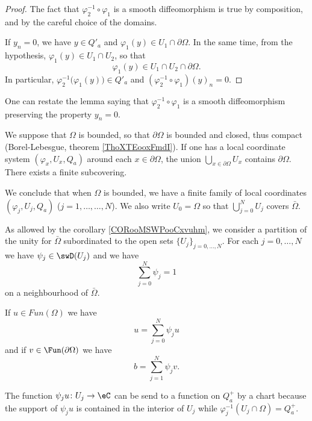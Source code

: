 \begin{proof}
    The fact that \( \varphi_2^{-1}\circ\varphi_1\) is a smooth diffeomorphism is true by composition, and by the careful choice of the domains. 

    If \( y_n=0\), we have \( y\in Q'_a\) and \( \varphi_1(y)\in U_1\cap \partial\Omega\). In the same time, from the hypothesis, \( \varphi_1(y)\in U_1\cap U_2\), so that
    \begin{equation}
        \varphi_1(y)\in U_1\cap U_2\cap\partial\Omega.
    \end{equation}
    In particular, \( \varphi_2^{-1}\big( \varphi_1(y) \big)\in Q'_a\) and \( (\varphi_2^{-1}\circ\varphi_1)(y)_n=0\).
\end{proof}
One can restate the lemma saying that \( \varphi_2^{-1}\circ\varphi_1\) is a smooth diffeomorphism preserving the property \( y_n=0\).

\begin{normaltext}
    We suppose that \( \Omega\) is bounded, so that \( \partial\Omega\) is bounded and closed, thus compact (Borel-Lebesgue, theorem \ref{ThoXTEooxFmdI}). If one has a local coordinate system \( (\varphi_x,U_x,Q_a)\) around each \( x\in \partial\Omega\), the union \( \bigcup_{x\in\partial \Omega}U_x\) contains \( \partial\Omega\). There exists a finite subcovering. 

    We conclude that when \( \Omega\) is bounded, we have a finite family of local coordinates \( (\varphi_j,U_j,Q_a)\) (\( j=1,\ldots,\ldots, N\)). We also write \( U_0=\Omega\) so that \( \bigcup_{j=0}^NU_j\) covers \( \bar\Omega\).
\end{normaltext}

As allowed by the corollary \ref{CORooMSWPooCxvuhm}, we consider a partition of the unity for \( \bar\Omega\) subordinated to the open sets \( \{ U_j \}_{j=0,\ldots, N}\). For each \( j=0,\ldots, N\) we have \( \psi_j\in\swD(U_j)\) and we have
\begin{equation}
    \sum_{j=0}^{N}\psi_j=1
\end{equation}
on a neighbourhood of \( \bar\Omega\).

If \( u\in Fun(\Omega)\) we have
\begin{equation}
    u=\sum_{j=0}^N\psi_ju
\end{equation}
and if \( v\in\Fun(\partial\Omega)\) we have
\begin{equation}
    b=\sum_{j=1}^N\psi_jv.
\end{equation}

The function \( \psi_ju\colon U_j\to \eC\) can be send to a function on \( Q_a^+\) by a chart because the support of \( \psi_ju\) is contained in the interior of \( U_j\) while \( \varphi_j^{-1}(U_j\cap\Omega)=Q_a^+\).

